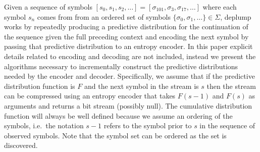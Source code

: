 Given a sequence of symbols $[s_0, s_1, s_2, \ldots]= [\sigma_{101}, \sigma_3, \sigma_{17}, \ldots]$ where each symbol $s_n$ comes from from an ordered set of symbols $\{\sigma_0, \sigma_1, \ldots\} \in \Sigma$,  deplump works by repeatedly producing a predictive distribution for the continuation of the sequence given the full preceding context and encoding the next symbol by passing that predictive distribution to an entropy encoder.  
In this paper explicit details related to encoding and decoding are not included, instead we present the algorithms necessary to incrementally construct the predictive distributions needed by the encoder and decoder.  Specifically, we assume that if the predictive distribution function is $F$ and the next symbol in the stream is $s$ then the stream can be compressed using an entropy encoder that takes $F(s-1)$ and $F(s)$ as arguments and returns a bit stream (possibly null)\cite{rangeencoding,arithmeticencoding}.   The cumulative distribution function will always be well defined because we assume an ordering of the symbols, i.e.~the notation $s-1$ refers to the symbol prior to $s$ in the sequence of observed symbols.  Note that the symbol set can be ordered as the set is discovered.


